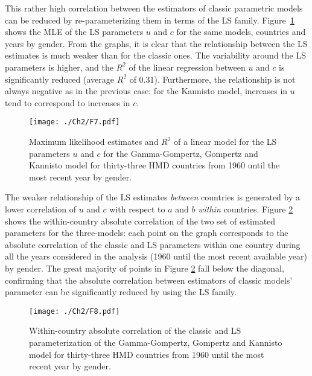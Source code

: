 \documentclass[Thesis]{subfiles}
\begin{document}
This rather high correlation between the estimators of classic parametric models can be reduced by re-parameterizing them in terms of the LS family. Figure~\ref{Fig:Ch2CorrLS} shows the MLE of the LS parameters $u$ and $c$ for the same models, countries and years by gender. From the graphs, it is clear that the relationship between the LS estimates is much weaker than for the classic ones. The variability around the LS parameters is higher, and the $R^2$ of the linear regression between $u$ and $c$ is significantly reduced (average $R^2$ of 0.31). Furthermore, the relationship is not always negative as in the previous case: for the Kannisto model, increases in $u$ tend to correspond to increases in $c$. 

\begin{figure}[!ht]
	\centering
	\texttt{[image: ./Ch2/F7.pdf]}
	\caption{Maximum likelihood estimates and $R^2$ of a linear model for the LS parameters $u$ and $c$ for the Gamma-Gompertz, Gompertz and Kannisto model for thirty-three HMD countries from 1960 until the most recent year by gender.}\label{Fig:Ch2CorrLS}
	
\end{figure}

The weaker relationship of the LS estimates \textit{between} countries is generated by a lower correlation of $u$ and $c$ with respect to $a$ and $b$ \textit{within} countries. Figure \ref{Fig:Ch2CorrWithinCou} shows the within-country absolute correlation of the two set of estimated parameters for the three-models: each point on the graph corresponds to the absolute correlation of the classic and LS parameters within one country during all the years considered in the analysis (1960 until the most recent available year) by gender.  The great majority of points in Figure \ref{Fig:Ch2CorrWithinCou} fall below the diagonal, confirming that the absolute correlation between estimators of classic models' parameter can be significantly reduced by using the LS family.

\begin{figure}[!ht]
	\centering
	\texttt{[image: ./Ch2/F8.pdf]}
	\caption{Within-country absolute correlation of the classic and LS parameterization of the Gamma-Gompertz, Gompertz and Kannisto model for thirty-three HMD countries from 1960 until the most recent year by gender.}\label{Fig:Ch2CorrWithinCou}
	
\end{figure}
\end{document}
